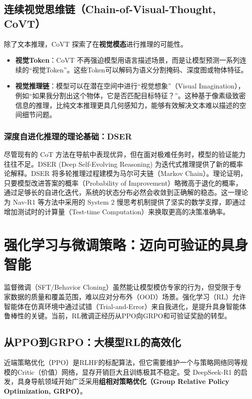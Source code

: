 \subsection{连续视觉思维链（Chain-of-Visual-Thought, CoVT）}
除了文本推理，CoVT   探索了在\textbf{视觉模态}进行推理的可能性。
\begin{itemize}
    \item \textbf{视觉Token}：CoVT 不再强迫模型用语言描述场景，而是让模型预测一系列连续的“视觉Token”。这些Token可以解码为语义分割掩码、深度图或物体特征。
    \item \textbf{视觉推理链}：模型可以在潜在空间中进行“视觉想象”（Visual Imagination），例如“如果我分割出这个物体，它是否匹配目标特征？”。这种基于像素级致密信息的推理，比纯文本推理更具几何感知力，能够有效解决文本难以描述的空间细节问题。
\end{itemize}

\subsubsection{深度自进化推理的理论基础：DSER}
尽管现有的 CoT 方法在导航中表现优异，但在面对极难任务时，模型的验证能力往往不足。DSER (Deep Self-Evolving Reasoning) \cite{dser_reasoning} 为迭代式推理提供了新的概率论解释。DSER 将多轮推理过程建模为马尔可夫链（Markov Chain）。理论证明，只要模型改进答案的概率（Probability of Improvement）略微高于退化的概率，通过足够长的自进化迭代，系统的状态分布必然会收敛到正确解的稳态。这一理论为 Nav-R1 等方法中采用的 System 2 慢思考机制提供了坚实的数学支撑，即通过增加测试时的计算量（Test-time Computation）来换取更高的决策准确率。

\section{强化学习与微调策略：迈向可验证的具身智能}
监督微调（SFT/Behavior Cloning）虽然能让模型模仿专家的行为，但受限于专家数据的质量和覆盖范围，难以应对分布外（OOD）场景。强化学习（RL）允许智能体在仿真环境中通过试错（Trial-and-Error）来自我进化，是提升具身智能体鲁棒性的关键。当前，RL微调正经历从PPO向GRPO和可验证奖励的转型。

\subsection{从PPO到GRPO：大模型RL的高效化}
近端策略优化（PPO）是RLHF的标配算法，但它需要维护一个与策略网络同等规模的Critic（价值）网络，显存开销巨大且训练极其不稳定。受 DeepSeek-R1 \cite{deepseek_r1} 的启发，具身导航领域开始广泛采用\textbf{组相对策略优化（Group Relative Policy Optimization, GRPO）}。

